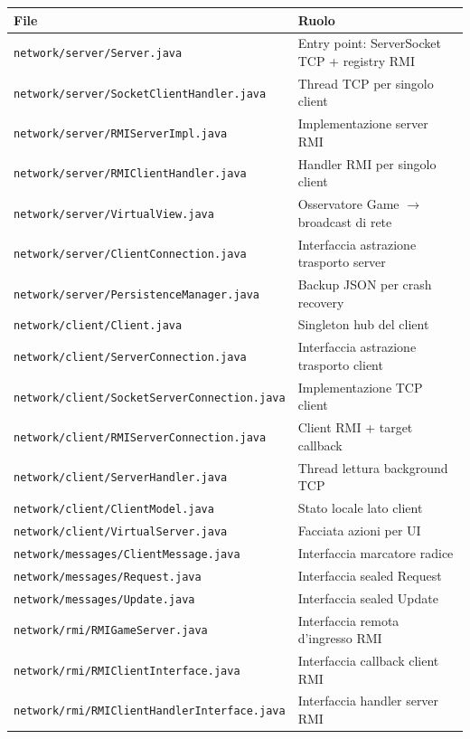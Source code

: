 \documentclass[a4paper,12pt]{article}
\newcommand{\code}[1]{\texttt{#1}}
\begin{document}
\begin{small}
\begin{tabularx}{\textwidth}{@{}p{7.5cm}X@{}}
\toprule
\textbf{File} & \textbf{Ruolo} \\
\midrule
\code{network/server/Server.java}               & Entry point: ServerSocket TCP + registry RMI \\
\code{network/server/SocketClientHandler.java}  & Thread TCP per singolo client \\
\code{network/server/RMIServerImpl.java}        & Implementazione server RMI \\
\code{network/server/RMIClientHandler.java}     & Handler RMI per singolo client \\
\code{network/server/VirtualView.java}          & Osservatore Game $\to$ broadcast di rete \\
\code{network/server/ClientConnection.java}     & Interfaccia astrazione trasporto server \\
\code{network/server/PersistenceManager.java}   & Backup JSON per crash recovery \\
\code{network/client/Client.java}               & Singleton hub del client \\
\code{network/client/ServerConnection.java}     & Interfaccia astrazione trasporto client \\
\code{network/client/SocketServerConnection.java} & Implementazione TCP client \\
\code{network/client/RMIServerConnection.java}  & Client RMI + target callback \\
\code{network/client/ServerHandler.java}        & Thread lettura background TCP \\
\code{network/client/ClientModel.java}          & Stato locale lato client \\
\code{network/client/VirtualServer.java}        & Facciata azioni per UI \\
\code{network/messages/ClientMessage.java}      & Interfaccia marcatore radice \\
\code{network/messages/Request.java}            & Interfaccia sealed Request \\
\code{network/messages/Update.java}             & Interfaccia sealed Update \\
\code{network/rmi/RMIGameServer.java}           & Interfaccia remota d'ingresso RMI \\
\code{network/rmi/RMIClientInterface.java}      & Interfaccia callback client RMI \\
\code{network/rmi/RMIClientHandlerInterface.java} & Interfaccia handler server RMI \\
\bottomrule
\end{tabularx}
\end{small}
\end{document}

